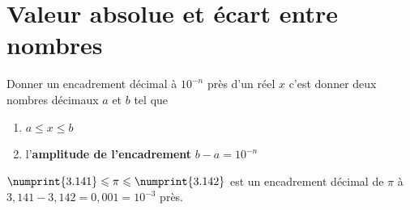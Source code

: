 %	 


%	 
\newpage 
{}  
\pagestyle{scrheadings} %
\onehalfspacing
\section{Valeur absolue et écart entre nombres}

\begin{definition}
	Donner un encadrement décimal à $10^{-n}$ près d'un réel $x$ c'est donner deux nombres décimaux $a$ et $b$ tel que 
	\begin{enumerate}[label=\textbullet]
		\item $a\leqslant x \leqslant b$
		\item l'\textbf{amplitude de l'encadrement} $b-a= 10^{-n}$
	\end{enumerate}   
\end{definition}
\begin{example} $\numprint{3.141}\leqslant \pi \leqslant \numprint{3.142}$ est un encadrement décimal de $\pi$ à $3,141-3,142=0,001=10^{-3}$ près.
\end{example}


